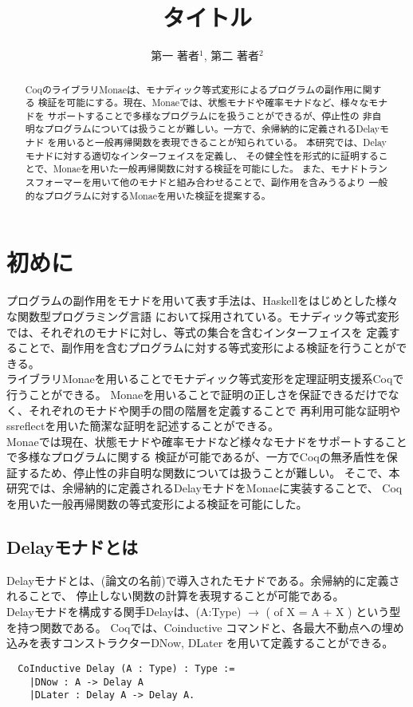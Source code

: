 \documentclass[japanese]{jssst_ppl}
\title{タイトル}
\author{第一 著者$^1$, 第二 著者$^2$}
\theoremstyle{definition}
\begin{document}
\maketitle
\begin{abstract}
  CoqのライブラリMonaeは、モナディック等式変形によるプログラムの副作用に関する
  検証を可能にする。現在、Monaeでは、状態モナドや確率モナドなど、様々なモナドを
  サポートすることで多様なプログラムにを扱うことができるが、停止性の
  非自明なプログラムについては扱うことが難しい。一方で、余帰納的に定義されるDelayモナド
  を用いると一般再帰関数を表現できることが知られている。
  本研究では、Delayモナドに対する適切なインターフェイスを定義し、
  その健全性を形式的に証明することで、Monaeを用いた一般再帰関数に対する検証を可能にした。
  また、モナドトランスフォーマーを用いて他のモナドと組み合わせることで、副作用を含みうるより
  一般的なプログラムに対するMonaeを用いた検証を提案する。
\end{abstract}

\section{初めに}
プログラムの副作用をモナドを用いて表す手法は、Haskellをはじめとした様々な関数型プログラミング言語
において採用されている。モナディック等式変形では、それぞれのモナドに対し、等式の集合を含むインターフェイスを
定義することで、副作用を含むプログラムに対する等式変形による検証を行うことができる。\\
ライブラリMonaeを用いることでモナディック等式変形を定理証明支援系Coqで行うことができる。
Monaeを用いることで証明の正しさを保証できるだけでなく、それぞれのモナドや関手の間の階層を定義することで
再利用可能な証明やssreflectを用いた簡潔な証明を記述することができる。\\
Monaeでは現在、状態モナドや確率モナドなど様々なモナドをサポートすることで多様なプログラムに関する
検証が可能であるが、一方でCoqの無矛盾性を保証するため、停止性の非自明な関数については扱うことが難しい。
そこで、本研究では、余帰納的に定義されるDelayモナドをMonaeに実装することで、
Coqを用いた一般再帰関数の等式変形による検証を可能にした。

\subsection{Delayモナドとは}

Delayモナドとは、(論文の名前)で導入されたモナドである。余帰納的に定義されることで、
停止しない関数の計算を表現することが可能である。\\
Delayモナドを構成する関手Delayは、(A:Type) $\rightarrow$ ( of X = A + X )
という型を持つ関数である。
Coqでは、Coinductive コマンドと、各最大不動点への埋め込みを表すコンストラクターDNow, DLater
を用いて定義することができる。
\begin{verbatim}
  CoInductive Delay (A : Type) : Type :=
    |DNow : A -> Delay A
    |DLater : Delay A -> Delay A.
                \end{verbatim}
\end{document}
